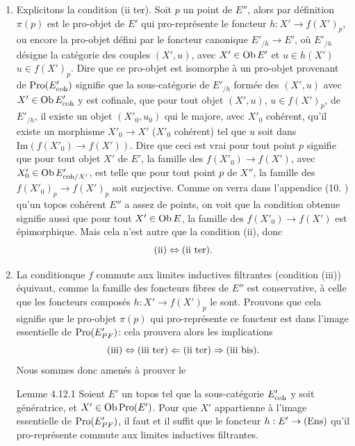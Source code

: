 \documentclass[10pt]{../fichiers-configuration-latex/smfart}
\begin{document}
\begin{enumerate}
\item Explicitons la condition (ii ter). Soit $p$ un point de $E''$,
  alors par définition $\pi(p)$ est le pro-objet de $E'$ qui
  pro-représente le foncteur $h : X'\to f(X')_{p}$, ou encore la
  pro-objet défini par le foncteur canonique $E'_{/h} \to E'$, où
  $E'_{/h}$  désigne la catégorie des couples $(X', u)$, avec $X'\in
  \operatorname{Ob} E'$ et $u \in h(X')$ \ie $u \in f(X')_p$. Dire que ce pro-objet
  est isomorphe à un pro-objet provenant de $\operatorname{Pro}(E'_{\mathrm{coh}})$ signifie
  que la sous-catégorie de $E'_{/h}$ formée des $(X', u)$ avec
  $X'\in \operatorname{Ob} E'_{\mathrm{coh}}$  y est cofinale, \ie que pour tout objet $(X',
  u)$, $u \in f(X')_p$, de $E'_{/h}$, il existe un objet $(X'_0,
  u_0)$ qui le majore, avec $X'_0$ cohérent, \ie qu'il existe un
  morphisme $X'_0 \to X'$ ($X'_0$ cohérent) tel que $u$ soit
  dans $\text{Im}(f(X'_0) \to f(X'))$. Dire que ceci est vrai pour tout
  point $p$ signifie que pour tout objet $X'$ de $E'$, la famille des
$f(X'_{0})\to f(X')$, avec $X'_0 \in \operatorname{Ob} E'_{\mathrm{coh}/X'}$, est telle que pour tout point $p$ de $X''$, la famille des $f(X'_0)_p \to f(X')_p$ soit surjective. Comme on verra dans
  l'appendice (10. ) qu'un topos cohérent $E''$ a assez de points, on
  voit que la condition obtenue signifie aussi que pour tout $X'\in \operatorname{Ob}
  E$, la famille des $f(X'_0) \to f(X')$ est épimorphique. Mais cela
  n'est autre que la condition (ii), donc
$$
{\rm(ii)} \Leftrightarrow \text{(ii ter)}{}.
$$

\item La condition\pageoriginale que $f$ commute aux limites
  inductives filtrantes   (condition (iii)) équivaut, comme la famille des foncteurs fibres
  de $E''$ est conservative, à celle que les foncteurs composés $h :
  X'\to f(X')_p$ le sont. Prouvons que cela signifie que le pro-objet
  $\pi(p)$ qui pro-représente ce foncteur est dans l'image essentielle
  de $\operatorname{Pro}(E'_{PF})$: cela prouvera alors les implications
$$
{\rm(iii)} \Leftrightarrow \text{(iii ter)} \Leftarrow \text{(ii ter)}
\Rightarrow \text{(iii bis)}{}.
$$
Nous sommes donc amenés à prouver le

\begin{enonce*}{Lemme 4.12.1}
Soient $E'$ un topos tel que la sous-catégorie $E'_{\mathrm{coh}}$ y soit
génératrice, et $X' \in \operatorname{Ob} \operatorname{Pro}(E')$. Pour que $X'$ appartienne à
l'image essentielle de $\operatorname{Pro}(E'_{PF})$, il faut et il suffit que le
foncteur $h : E'\to (\Ens)$ qu'il pro-représente commute aux limites
inductives filtrantes.
\end{enonce*}


\end{enumerate}
\end{document}
